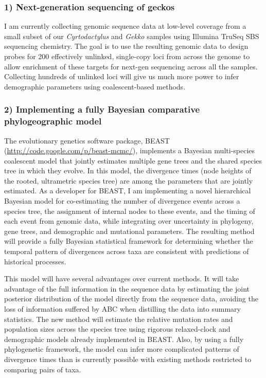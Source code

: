 \documentclass[10pt]{article}
\begin{document}
\subsubsection*{1) Next-generation sequencing of geckos}
I am currently collecting genomic sequence data at low-level coverage from a
small subset of our \emph{Cyrtodactylus} and \emph{Gekko} samples using
Illumina TruSeq SBS sequencing chemistry.
The goal is to use the resulting genomic data to design probes for 200
effectively unlinked, single-copy loci from across the genome to allow
enrichment of these targets for next-gen sequencing across all the samples.
Collecting hundreds of unlinked loci will give us much more power to infer
demographic parameters using coalescent-based methods.

\subsubsection*{2) Implementing a fully Bayesian comparative phylogeographic
model}
The evolutionary genetics software package, BEAST
(\url{http://code.google.com/p/beast-mcmc/}), implements a Bayesian
multi-species coalescent model that jointly estimates multiple gene trees and
the shared species tree in which they evolve.
In this model, the divergence times (node heights of the rooted, ultrametric
species tree) are among the parameters that are jointly estimated.
As a developer for BEAST, I am implementing a novel hierarchical Bayesian model
for co-estimating the number of divergence events across a species tree, the
assignment of internal nodes to these events, and the timing of each event from
genomic data, while integrating over uncertainty in phylogeny, gene trees, and
demographic and mutational parameters.
The resulting method will provide a fully Bayesian statistical framework
for determining whether the temporal pattern of divergences across taxa are
consistent with predictions of historical processes.

This model will have several advantages over current methods.
It will take advantage of the full information in the sequence data by
estimating the joint posterior distribution of the model directly from the
sequence data, avoiding the loss of information suffered by ABC when distilling
the data into summary statistics.
The new method will estimate the relative mutation rates and population sizes
across the species tree using rigorous relaxed-clock and demographic models
already implemented in BEAST.
Also, by using a fully phylogenetic framework, the model can infer more
complicated patterns of divergence times than is currently possible with
existing methods restricted to comparing pairs of taxa.
\end{document}
